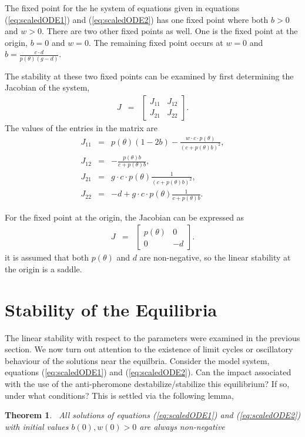 \documentclass[12pt]{article}
\newtheorem{theorem}{Theorem}[section]
\begin{document}
The fixed point for the he system of equations given in equations
(\ref{eq:scaledODE1}) and (\ref{eq:scaledODE2}) has one fixed point
where both $b>0$ and $w>0$. There are two other fixed points as
well. One is the fixed point at the origin, $b=0$ and $w=0$.
The remaining fixed point occurs at $w=0$ and $b=\frac{c\cdot
  d}{p(\theta)\left(g - d\right)}$.

The stability at these two fixed points can be examined by first
determining the Jacobian of the system,
\begin{eqnarray*}
  J & = & \left[
          \begin{array}{rr}
            J_{11} & J_{12} \\
            J_{21} & J_{22}
          \end{array}
          \right].
\end{eqnarray*}
The values of the entries in the matrix are
\begin{eqnarray*}
  J_{11} & = & p(\theta)\left(1-2b\right) -
               \frac{w\cdot c \cdot p(\theta)}{\left( c + p(\theta)b \right)^2}, \\
  J_{12} & = & -\frac{p(\theta)b}{c+p(\theta)b}, \\
  J_{21} & = & g\cdot c \cdot  p(\theta) \frac{1}{\left(c+p(\theta)b\right)^2}, \\
  J_{22} & = & -d + g\cdot c \cdot  p(\theta) \frac{1}{c+p(\theta)b}.
\end{eqnarray*}

For the fixed point at the origin, the Jacobian can be expressed as 
\begin{eqnarray*}
  J & = & \left[
          \begin{array}{rr}
            p(\theta) & 0 \\
            0 & -d
          \end{array}
          \right].
\end{eqnarray*}
it is assumed that both $p(\theta)$ and $d$ are non-negative, so the
linear stability at the origin is a saddle.


\section{Stability of the Equilibria}
\label{appendix:stability}

The linear stability with respect to the parameters were examined in
the previous section. We now turn out attention to the existence of
limit cycles or oscillatory behaviour of the solutions near the
equilbria. Consider the model system, equations (\ref{eq:scaledODE1})
and (\ref{eq:scaledODE2}). Can the impact associated with the use of
the anti-pheromone destabilize/stabilize this equilibrium? If so,
under what conditions? This is settled via the following lemma,
\begin{theorem}
  \bigskip\ All solutions of equations (\ref{eq:scaledODE1}) and
  (\ref{eq:scaledODE2}) with initial values
  $b\left( 0\right) ,w\left( 0\right) >0$ are always non-negative
\end{theorem}
\end{document}
